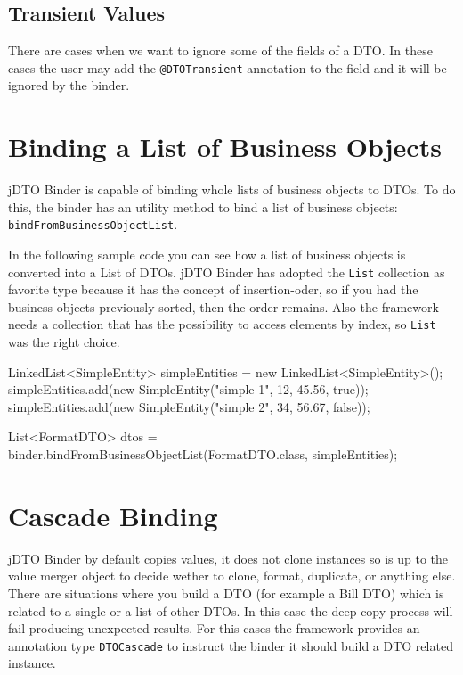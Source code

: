 \documentclass[11pt]{article}
\newcommand{\JDTO}{jDTO Binder\xspace}
\begin{document}
\subsection{Transient Values}


There are cases when we want to ignore some of the fields of a DTO. In these cases the user may add the \texttt{@DTOTransient} annotation to the field and it will be ignored by the binder.

\section{Binding a List of Business Objects}


\JDTO is capable of binding whole lists of business objects to DTOs. To do this, the binder has an utility method to bind a list of business objects: \texttt{bindFromBusinessObjectList}.

In the following sample code you can see how a list of business objects is converted into a List of DTOs. \JDTO has adopted the \texttt{List} collection as favorite type because it has the concept of insertion-oder, so if you had the business objects previously sorted, then the order remains. Also the framework needs a collection that has the possibility to access elements by index, so \texttt{List} was the right choice.


\begin{java}
LinkedList<SimpleEntity> simpleEntities = 
    new LinkedList<SimpleEntity>();
simpleEntities.add(new SimpleEntity("simple 1", 12, 45.56, true));
simpleEntities.add(new SimpleEntity("simple 2", 34, 56.67, false));

List<FormatDTO> dtos = binder.bindFromBusinessObjectList(FormatDTO.class, simpleEntities);
\end{java}


\section{Cascade Binding}


\JDTO by default copies values, it does not clone instances so is up to the value merger object to decide wether to clone, format, duplicate, or anything else. 
There are situations where you build a DTO (for example a Bill DTO) which is related to a single or a list of other DTOs. In this case the deep copy process will fail producing unexpected results. For this cases the framework provides an annotation type \texttt{DTOCascade} to instruct the binder it should build a DTO related instance.
\end{document}
